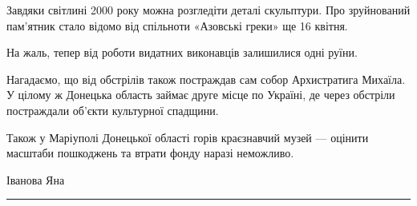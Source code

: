 \begin{center}
\begin{fminipage}{0.8\textwidth}
Завдяки світлині 2000 року можна розгледіти деталі скульптури. Про зруйнований
пам'ятник стало відомо від спільноти «Азовські греки» ще 16 квітня.

На жаль, тепер від роботи видатних виконавців залишилися одні руїни.

Нагадаємо, що від обстрілів також постраждав сам собор Архистратига Михаїла. У
цілому ж Донецька область займає друге місце по Україні, де через обстріли
постраждали об'єкти культурної спадщини.

Також у Маріуполі Донецької області горів краєзнавчий музей — оцінити масштаби
пошкоджень та втрати фонду наразі неможливо.

Іванова Яна

\end{fminipage}
\end{center}

\par\noindent\rule{\textwidth}{0.4pt}

